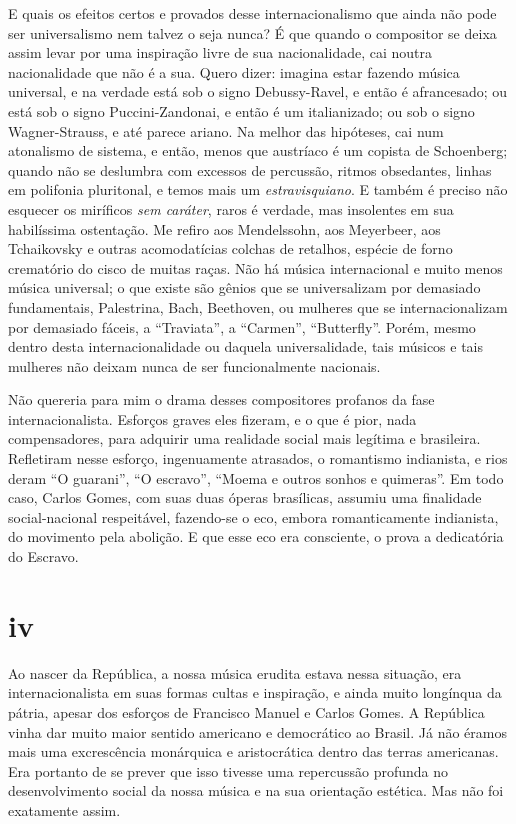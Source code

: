 E quais os efeitos certos e provados desse internacionalismo que ainda
não pode ser universalismo nem talvez o seja nunca? É que quando o
compositor se deixa assim levar por uma inspiração livre de sua
nacionalidade, cai noutra nacionalidade que não é a sua. Quero dizer:
imagina estar fazendo música universal, e na verdade está sob o signo
Debussy-Ravel, e então é afrancesado; ou está sob o signo
Puccini-Zandonai, e então é um italianizado; ou sob o signo
Wagner-Strauss, e até parece ariano. Na melhor das hipóteses, cai num
atonalismo de sistema, e então, menos que austríaco é um copista de
Schoenberg; quando não se deslumbra com excessos de percussão, ritmos
obsedantes, linhas em polifonia pluritonal, e temos mais um
\textit{estravisquiano}. E também é preciso não esquecer os miríficos \textit{sem
caráter}, raros é verdade, mas insolentes em sua habilíssima
ostentação. Me refiro aos Mendelssohn, aos Meyerbeer, aos Tchaikovsky e
outras acomodatícias colchas de retalhos, espécie de forno crematório do
cisco de muitas raças. Não há música internacional e muito menos música
universal; o que existe são gênios que se universalizam por demasiado
fundamentais, Palestrina, Bach, Beethoven, ou mulheres que se
internacionalizam por demasiado fáceis, a ``Traviata'', a ``Carmen'',
``Butterfly''. Porém, mesmo dentro desta internacionalidade ou daquela
universalidade, tais músicos e tais mulheres não deixam nunca de ser
funcionalmente nacionais.

Não quereria para mim o drama desses compositores profanos da fase
internacionalista. Esforços graves eles fizeram, e o que é pior, nada
compensadores, para adquirir uma realidade social mais legítima e
brasileira. Refletiram nesse esforço, ingenuamente atrasados, o
romantismo indianista, e rios deram ``O guarani'', ``O escravo'', ``Moema e outros
sonhos e quimeras''. Em todo caso, Carlos Gomes, com suas duas óperas
brasílicas, assumiu uma finalidade social-nacional respeitável,
fazendo-se o eco, embora romanticamente indianista, do movimento pela
abolição. E que esse eco era consciente, o prova a dedicatória do
Escravo.

\section*{iv}

Ao nascer da República, a nossa música erudita estava nessa situação,
era internacionalista em suas formas cultas e inspiração, e ainda muito
longínqua da pátria, apesar dos esforços de Francisco Manuel e Carlos
Gomes. A República vinha dar muito maior sentido americano e democrático
ao Brasil. Já não éramos mais uma excrescência monárquica e
aristocrática dentro das terras americanas. Era portanto de se prever
que isso tivesse uma repercussão profunda no desenvolvimento social da
nossa música e na sua orientação estética. Mas não foi exatamente assim.

